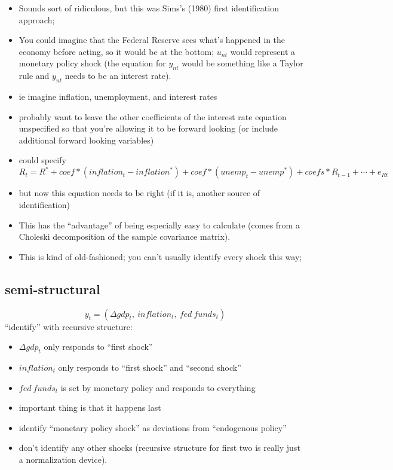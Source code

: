 \begin{itemize}
\item Sounds sort of ridiculous, but this was Sims's (1980) first
  identification approach;
\item You could imagine that the Federal Reserve sees what's happened
  in the economy before acting, so it would be at the bottom; $u_{nt}$
  would represent a monetary policy shock (the equation for $y_{nt}$
  would be something like a Taylor rule and $y_{nt}$ needs to be an
  interest rate).
\item ie imagine inflation, unemployment, and interest rates
\item probably want to leave the other coefficients of the interest
  rate equation unspecified so that you're allowing it to be forward
  looking (or include additional forward looking variables)
\item could specify 
  \begin{equation*}
    R_t = R^* + coef * (inflation_t - inflation^*) + coef * (unemp_t - unemp^*) + coefs *
    R_{t-1} + ⋯ + e_{Rt}
  \end{equation*}
\item but now this equation needs to be right (if it is, another
  source of identification)
\item This has the ``advantage'' of being especially easy to calculate
  (comes from a Choleski decomposition of the sample covariance
  matrix).
\item This is kind of old-fashioned; you can't usually identify every
  shock this way;
\end{itemize}

\subsection{semi-structural}
\[y_t = (Δ gdp_t,\ inflation_t,\ fed\ funds_t)\]
``identify'' with recursive structure: 
\begin{itemize}
\item $Δ gdp_t$ only responds to
``first shock''
\item $inflation_t$ only responds to ``first shock'' and
``second shock''
\item $fed\ funds_t$ is set by monetary policy and responds
to everything
\item important thing is that it happens last
\item identify ``monetary policy shock'' as deviations from
  ``endogenous policy''
\item don't identify any other shocks (recursive structure for first
  two is really just a normalization device).
\end{itemize}

